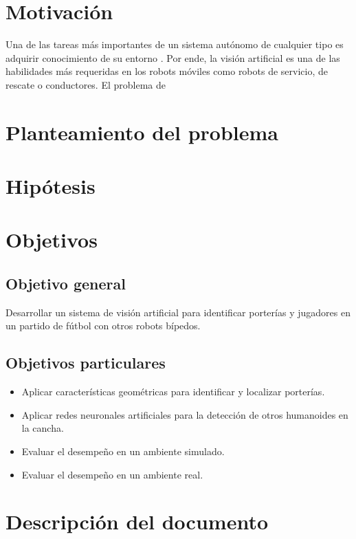\section{Motivación}
Una de las tareas más importantes de un sistema autónomo de cualquier tipo es adquirir conocimiento de su entorno\cite{siegwart2011introduction} . Por ende, la visión artificial es una de las habilidades más requeridas en los robots móviles como robots de servicio, de rescate o conductores.
El problema de 

\section{Planteamiento del problema}
\section{Hipótesis}

\section{Objetivos}
\subsection*{Objetivo general}
Desarrollar un sistema de visión artificial para identificar porterías y jugadores en un partido de fútbol con otros robots bípedos.
\subsection*{Objetivos particulares}
\begin{itemize}
    \item Aplicar características geométricas para identificar y localizar porterías.
    \item Aplicar redes neuronales artificiales para la detección de otros humanoides en la cancha.
    \item Evaluar el desempeño en un ambiente simulado.
    \item Evaluar el desempeño en un ambiente real.
\end{itemize}
\section{Descripción del documento}
